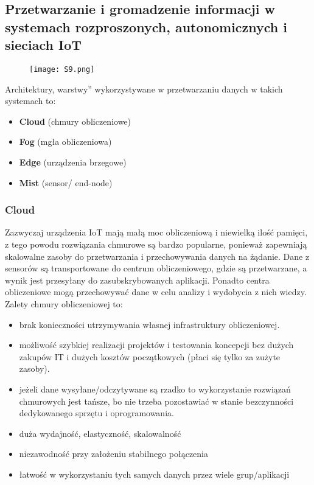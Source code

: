 \subsection{Przetwarzanie i gromadzenie informacji w systemach rozproszonych, autonomicznych i sieciach IoT}

\begin{figure}[H]
	\centering
	\texttt{[image: S9.png]}
\end{figure}

Architektury, warstwy” wykorzystywane w przetwarzaniu danych w takich systemach to:

\begin{itemize}
	\item \textbf{Cloud} (chmury obliczeniowe)
	\item \textbf{Fog} (mgła obliczeniowa)
	\item \textbf{Edge} (urządzenia brzegowe)
	\item \textbf{Mist} (sensor/ end-node)
\end{itemize}

\subsubsection{Cloud}

Zazwyczaj urządzenia IoT mają małą moc obliczeniową i niewielką ilość pamięci, z tego powodu rozwiązania chmurowe są bardzo popularne, ponieważ zapewniają skalowalne zasoby do przetwarzania i przechowywania danych na żądanie. Dane z sensorów są transportowane do centrum obliczeniowego, gdzie są przetwarzane, a wynik jest przesyłany do zasubskrybowanych aplikacji. Ponadto centra obliczeniowe mogą przechowywać dane w celu analizy i wydobycia z nich wiedzy. \\

Zalety chmury obliczeniowej to:

\begin{itemize}
	\item brak konieczności utrzymywania własnej infrastruktury obliczeniowej.
	\item możliwość szybkiej realizacji projektów i testowania koncepcji bez dużych zakupów IT i dużych kosztów początkowych (płaci się tylko za zużyte zasoby).
	\item jeżeli dane wysyłane/odczytywane są rzadko to wykorzystanie rozwiązań chmurowych jest tańsze, bo nie trzeba pozostawiać w stanie bezczynności dedykowanego sprzętu i oprogramowania.
	\item duża wydajność, elastyczność, skalowalność
	\item niezawodność przy założeniu stabilnego połączenia
	\item łatwość w wykorzystaniu tych samych danych przez wiele grup/aplikacji \\
\end{itemize}

